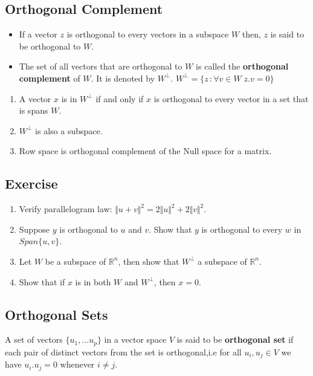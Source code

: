 \documentclass[aima104_lecturenotes_ku.tex]{subfiles}
\begin{document}
\subsection{Orthogonal Complement}
\begin{itemize}
\item If a vector $z$ is orthogonal to every vectors in a subspace $W$ then, $z$ is said to be orthogonal to $W$.

\item The set of all vectors that are orthogonal to $W$ is called the \textbf{orthogonal complement} of $W$. It is denoted by $W^{\perp}$. $W^{\perp} = \{z \, : \forall v \in W \;  z.v=0 \} $
\end{itemize}

\begin{thm}
  \begin{enumerate}
  \item A vector $x$ is in $W^{\perp}$ if and only if $x$ is orthogonal to every vector in a set that is spans $W$.
  \item $W^{\perp}$ is also a subspace.
   \item Row space is orthogonal complement of the Null space for a matrix.
  \end{enumerate}
\end{thm}

\subsection{Exercise}
\begin{enumerate}
 \item Verify parallelogram law: $\Vert u+v \Vert ^2 = 2 \Vert u \Vert ^2 + 2 \Vert v \Vert ^2$.
 \item Suppose $y$ is orthogonal to $u$ and $v$. Show that $y$ is orthogonal to every $w$ in $Span\{u,v\}$.
 \item Let $W$ be a subspace of $\mathbb{R}^n$, then show that $W^{\perp}$ a subspace of $\mathbb{R}^n$.
\item Show that if $x$ is in both $W$ and $W^{\perp}$, then $x=0$.
\end{enumerate}
\subsection{Orthogonal Sets}
A set of vectors $\{ u_1, ...u_p\}$ in a vector space $V$ is said to be \textbf{orthogonal set} if each pair of distinct vectors from the set is orthogonal,i.e for all $u_i, u_j \in V$ we have $u_i.u_j = 0$ whenever $i \neq j$.
\end{document}
